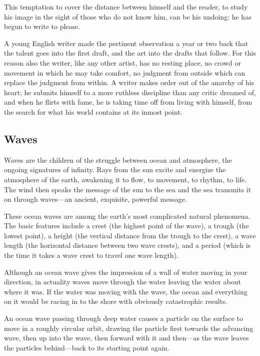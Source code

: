 \documentclass[11pt]{article}
\begin{document}
This temptation to cover the distance between himself and the reader, to study his image in the sight of those who do not know him, can be his undoing: he has begun to write to please.

A young English writer made the pertinent observation a year or two back that the talent goes into the first draft, and the art into the drafts that follow. For this reason also the writer, like any other artist, has no resting place, no crowd or movement in which he may take comfort, no judgment from outside which can replace the judgment from within. A writer makes order out of the anarchy of his heart; he submits himself to a more ruthless discipline than any critic dreamed of, and when he flirts with fame, he is taking time off from living with himself, from the search for what his world contains at its inmost point.
\subsection{Waves}
\label{sec-2-40}

Waves are the children of the struggle between ocean and atmosphere, the ongoing signatures of infinity. Rays from the sun excite and energize the atmosphere of the earth, awakening it to flow, to movement, to rhythm, to life. The wind then speaks the message of the sun to the sea and the sea transmits it on through waves---an ancient, exquisite, powerful message.

These ocean waves are among the earth's most complicated natural phenomena. The basic features include a crest (the highest point of the wave), a trough (the lowest point), a height (the vertical distance from the trough to the crest), a wave length (the horizontal distance between two wave crests), and a period (which is the time it takes a wave crest to travel one wave length).

Although an ocean wave gives the impression of a wall of water moving in your direction, in actuality waves move through the water leaving the water about where it was. If the water was moving with the wave, the ocean and everything on it would be racing in to the shore with obviously catastrophic results.

An ocean wave passing through deep water causes a particle on the surface to move in a roughly circular orbit, drawing the particle first towards the advancing wave, then up into the wave, then forward with it and then---as the wave leaves the particles behind---back to its starting point again.
\end{document}
